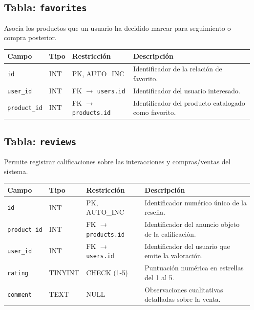 \documentclass[11pt,a4paper]{report}
\begin{document}
\subsection{Tabla: \texttt{favorites}}
Asocia los productos que un usuario ha decidido marcar para seguimiento o compra posterior.
\begin{table}[H]
\centering
\begin{tabularx}{\textwidth}{|l|l|l|L|}
\hline
{}\textbf{Campo} & \textbf{Tipo} & \textbf{Restricción} & \textbf{Descripción} \\ \hline
\texttt{id} & INT & PK, AUTO\_INC & Identificador de la relación de favorito. \\ \hline
\texttt{user\_id} & INT & FK $\rightarrow$ \texttt{users.id} & Identificador del usuario interesado. \\ \hline
\texttt{product\_id} & INT & FK $\rightarrow$ \texttt{products.id} & Identificador del producto catalogado como favorito. \\ \hline
\end{tabularx}
\end{table}

\subsection{Tabla: \texttt{reviews}}
Permite registrar calificaciones sobre las interacciones y compras/ventas del sistema.
\begin{table}[H]
\centering
\begin{tabularx}{\textwidth}{|l|l|l|L|}
\hline
{}\textbf{Campo} & \textbf{Tipo} & \textbf{Restricción} & \textbf{Descripción} \\ \hline
\texttt{id} & INT & PK, AUTO\_INC & Identificador numérico único de la reseña. \\ \hline
\texttt{product\_id} & INT & FK $\rightarrow$ \texttt{products.id} & Identificador del anuncio objeto de la calificación. \\ \hline
\texttt{user\_id} & INT & FK $\rightarrow$ \texttt{users.id} & Identificador del usuario que emite la valoración. \\ \hline
\texttt{rating} & TINYINT & CHECK (1-5) & Puntuación numérica en estrellas del 1 al 5. \\ \hline
\texttt{comment} & TEXT & NULL & Observaciones cualitativas detalladas sobre la venta. \\ \hline
\end{tabularx}
\end{table}
\end{document}
